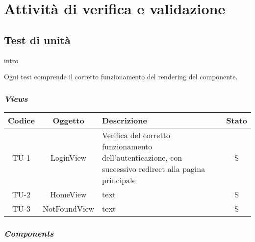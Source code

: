 \chapter{Attività di verifica e validazione}
\label{cap:verifica-validazione}


\section{Test di unità}
intro

Ogni test comprende il corretto funzionamento del rendering del componente.

\subsection*{\emph{Views}}

\begin{center}
  \label{tab:test-unita-views}
  \begin{longtable}{|c|c|p{}|c|}
  \hline
  \textbf{Codice} & \textbf{Oggetto} & \textbf{Descrizione} & \textbf{Stato}\\
  \hline
  TU-1 &LoginView &Verifica del corretto funzionamento dell'autenticazione, con successivo redirect alla pagina principale &S \\
  \hline
  TU-2 &HomeView &text &S \\
  \hline
  TU-3 &NotFoundView &text &S \\
  \hline
\end{longtable}
\end{center}

\subsection*{\emph{Components}}

